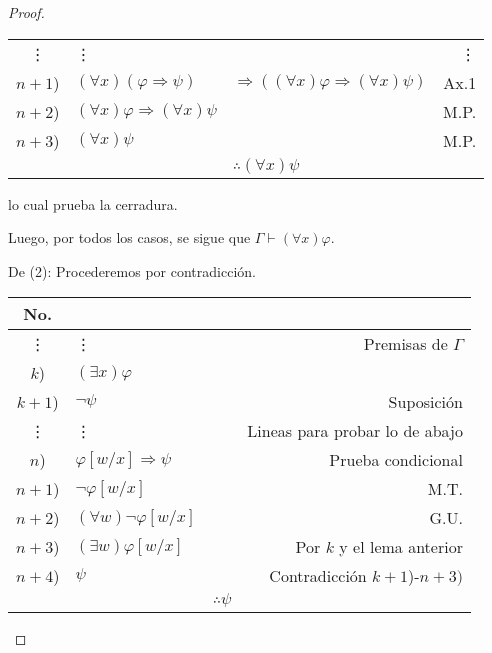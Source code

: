 \documentclass[12pt]{report}
\theoremstyle{largebreak}
\begin{document}
\begin{proof}
\begin{itemize}
\begin{center}
\begin{tabular}{ c  l  l  r  }
                    \vdots & \vdots  &  & \vdots  \\
                    $n+1$) & $(\forall x)(\varphi\Rightarrow\psi)$ & $\Rightarrow((\forall x)\varphi\Rightarrow(\forall x)\psi)$  &  Ax.1 \\
                    $n+2$) & $(\forall x)\varphi\Rightarrow(\forall x)\psi$ &  &  M.P. \\
                    $n+3$) & $(\forall x)\psi$ &  &  M.P. \\
                    \hline
                      &  &  $\therefore(\forall x)\psi$ &  \\
                \end{tabular}
            \end{center}
            lo cual prueba la cerradura.
        \end{itemize}
        Luego, por todos los casos, se sigue que $\Gamma\vdash(\forall x)\varphi$.

        De (2): Procederemos por contradicción.
        \begin{center}
            \begin{tabular}{ c  l  l  r  }
                \hline
                No. &  &  &  \\
                \hline
                \vdots & \vdots  &  & Premisas de $\Gamma$  \\
                $k$) & $(\exists x)\varphi$ &  &   \\
                $k+1$) & $\neg\psi$ &  & Suposición \\
                \vdots & \vdots  &  & Lineas para probar lo de abajo  \\
                $n$) & $\varphi[w/x]\Rightarrow\psi$ &  & Prueba condicional \\
                $n+1$) & $\neg\varphi[w/x]$ &  & M.T. \\
                $n+2$) & $(\forall w)\neg\varphi[w/x]$ &  & G.U. \\
                $n+3$) & $(\exists w)\varphi[w/x]$ &  & Por $k$ y el lema anterior \\
                $n+4$) & $\psi$ &  & Contradicción $k+1$)-$n+3)$ \\
                \hline
                  &  &  $\therefore\psi$ &  \\
            \end{tabular}
        \end{center}
    \end{proof}
\end{document}
